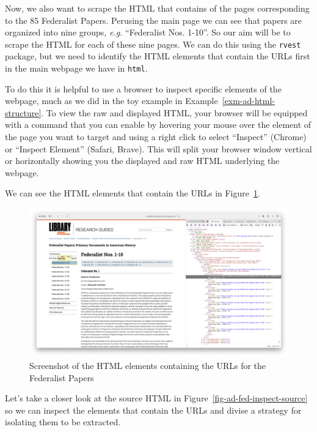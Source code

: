 \documentclass[
  letterpaper,
  DIV=11,
  numbers=noendperiod]{scrreport}
\theoremstyle{definition}
\theoremstyle{remark}
\begin{document}
Now, we also want to scrape the HTML that contains of the pages
corresponding to the 85 Federalist Papers. Perusing the main page we can
see that papers are organized into nine groups, \emph{e.g.} ``Federalist
Nos. 1-10''. So our aim will be to scrape the HTML for each of these
nine pages. We can do this using the \texttt{rvest} package, but we need
to identify the HTML elements that contain the URLs first in the main
webpage we have in \texttt{html}.

To do this it is helpful to use a browser to inspect specific elements
of the webpage, much as we did in the toy example in
Example~\ref{exm-ad-html-structure}. To view the raw and displayed HTML,
your browser will be equipped with a command that you can enable by
hovering your mouse over the element of the page you want to target and
using a right click to select ``Inspect'' (Chrome) or ``Inspect
Element'' (Safari, Brave). This will split your browser window vertical
or horizontally showing you the displayed and raw HTML underlying the
webpage.

We can see the HTML elements that contain the URLs in
Figure~\ref{fig-ad-fed-inspect}.

\begin{figure}[H]

{\centering \includegraphics[width=1\textwidth,height=\textheight]{figures/acquire-data/ad-fed-papers-loc-inspect.png}

}

\caption{\label{fig-ad-fed-inspect}Screenshot of the HTML elements
containing the URLs for the Federalist Papers}

\end{figure}

Let's take a closer look at the source HTML in
Figure~\ref{fig-ad-fed-inspect-source} so we can inspect the elements
that contain the URLs and divise a strategy for isolating them to be
extracted.
\end{document}
